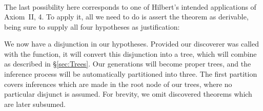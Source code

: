 {\begin{minipage}{\linewidth}
\begin{displaymath}
\begin{split}
     \end{split}
   \end{displaymath}
\end{minipage}}\linebreak

The last possibility here corresponds to one of Hilbert's intended applications of Axiom~II, 4. To apply it, all we need to do is assert the theorem as  derivable, being sure to supply all four hypotheses as justification:

\linebreak

We now have a disjunction in our hypotheses. Provided our discoverer was called with the  function, it will convert this disjunction into a tree, which will combine as described in \S\ref{sec:Trees}. Our generations will become proper trees, and the inference process will be automatically partitioned into three. The first partition covers inferences which are made in the root node of our trees, where no particular disjunct is assumed. For brevity, we omit discovered theorems which are later subsumed.

